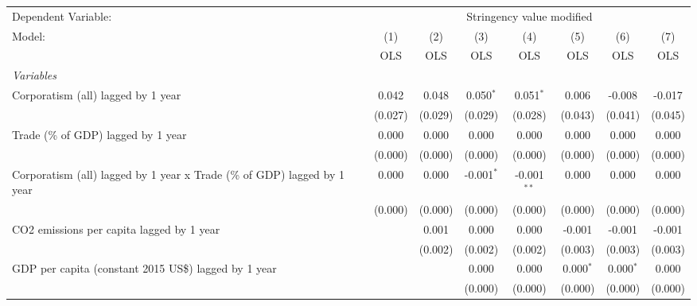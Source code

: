 
\begingroup
\centering
\begin{tabular}{lccccccc}
   \toprule
   Dependent Variable: & \multicolumn{7}{c}{Stringency value modified}\\
   Model:                                                                   & (1)     & (2)     & (3)          & (4)           & (5)         & (6)          & (7)\\  
                                                                            &  OLS    & OLS     & OLS          & OLS           & OLS         & OLS          & OLS\\  
   \midrule
   \emph{Variables}\\
   Corporatism (all) lagged by 1 year                                       & 0.042   & 0.048   & 0.050$^{*}$  & 0.051$^{*}$   & 0.006       & -0.008       & -0.017\\   
                                                                            & (0.027) & (0.029) & (0.029)      & (0.028)       & (0.043)     & (0.041)      & (0.045)\\   
   Trade (\% of GDP) lagged by 1 year                                       & 0.000   & 0.000   & 0.000        & 0.000         & 0.000       & 0.000        & 0.000\\   
                                                                            & (0.000) & (0.000) & (0.000)      & (0.000)       & (0.000)     & (0.000)      & (0.000)\\   
   Corporatism (all) lagged by 1 year x Trade (\% of GDP) lagged by 1 year  & 0.000   & 0.000   & -0.001$^{*}$ & -0.001$^{**}$ & 0.000       & 0.000        & 0.000\\   
                                                                            & (0.000) & (0.000) & (0.000)      & (0.000)       & (0.000)     & (0.000)      & (0.000)\\   
   CO2 emissions per capita lagged by 1 year                                &         & 0.001   & 0.000        & 0.000         & -0.001      & -0.001       & -0.001\\   
                                                                            &         & (0.002) & (0.002)      & (0.002)       & (0.003)     & (0.003)      & (0.003)\\   
   GDP per capita (constant 2015 US\$) lagged by 1 year                     &         &         & 0.000        & 0.000         & 0.000$^{*}$ & 0.000$^{*}$  & 0.000\\   
                                                                            &         &         & (0.000)      & (0.000)       & (0.000)     & (0.000)      & (0.000)\\   

\end{tabular}
